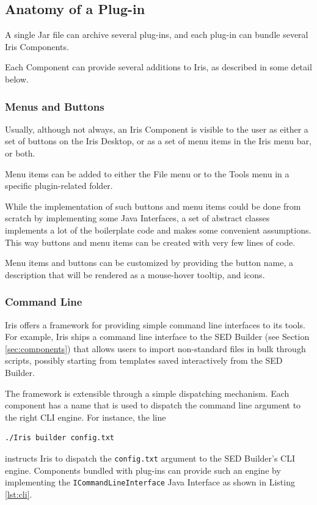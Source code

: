 \documentclass[preprint,authoryear,5p]{elsarticle}
\begin{document}
\subsection{Anatomy of a Plug-in} A single Jar file can archive several
plug-ins, and each plug-in can bundle several Iris Components.

Each Component can provide several additions to Iris, as described in some
detail below.

\subsubsection{Menus and Buttons} Usually, although not always, an Iris
Component is visible to the user as either a set of buttons on the Iris Desktop,
or as a set of menu items in the Iris menu bar, or both.

Menu items can be added to either the File menu or to the Tools menu in a
specific plugin-related folder.

While the implementation of such buttons and menu items could be done from
scratch by implementing some Java Interfaces, a set of abstract classes
implements a lot of the boilerplate code and makes some convenient assumptions.
This way buttons and menu items can be created with very few lines of code.

Menu items and buttons can be customized by providing the button name, a
description that will be rendered as a mouse-hover tooltip, and icons.

\subsubsection{Command Line} Iris offers a framework for providing simple
command line interfaces to its tools. For example, Iris ships a command line
interface to the SED Builder (see Section \ref{sec:components}) that allows
users to import non-standard files in bulk through scripts, possibly starting
from templates saved interactively from the SED Builder.

The framework is extensible through a simple dispatching mechanism. Each
component has a name that is used to dispatch the command line argument to the
right CLI engine. For instance, the line
\begin{lstlisting}[style=code]
./Iris builder config.txt
\end{lstlisting}
instructs Iris to dispatch the \verb|config.txt| argument to the SED Builder's
CLI engine. Components bundled with plug-ins can provide such an engine by implementing the
\verb|ICommandLineInterface| Java Interface as shown in Listing \ref{lst:cli}.
\end{document}

